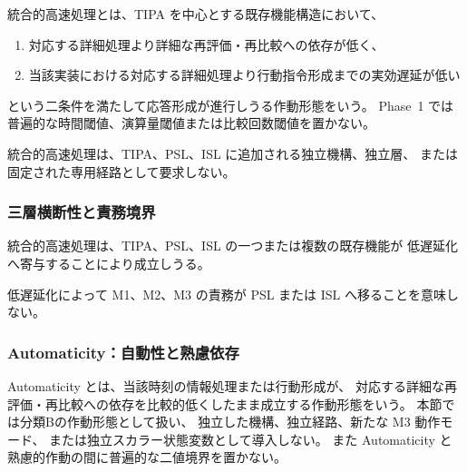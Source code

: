 \begin{definition}
\label{def:integrated_fast_processing}
統合的高速処理とは、TIPA を中心とする既存機能構造において、
\begin{enumerate}
  \item 対応する詳細処理より詳細な再評価・再比較への依存が低く、
  \item 当該実装における対応する詳細処理より行動指令形成までの実効遅延が低い
\end{enumerate}
という二条件を満たして応答形成が進行しうる作動形態をいう。
Phase~1 では普遍的な時間閾値、演算量閾値または比較回数閾値を置かない。
\end{definition}

\begin{remark}[高速処理は独立構成要素ではない]
\label{rem:fast_not_component}
統合的高速処理は、TIPA、PSL、ISL に追加される独立機構、独立層、
または固定された専用経路として要求しない。
\end{remark}

\subsubsection{三層横断性と責務境界}
\label{subsubsec:fast_cross_layer}

\begin{definition}
\label{def:fast_cross_layer}
統合的高速処理は、TIPA、PSL、ISL の一つまたは複数の既存機能が
低遅延化へ寄与することにより成立しうる。
\end{definition}

\begin{remark}[高速処理はTIPAの責務を代替しない]
\label{rem:fast_no_tipa_substitution}
低遅延化によって M1、M2、M3 の責務が PSL または ISL へ移ることを意味しない。
\end{remark}

\subsubsection{Automaticity：自動性と熟慮依存}
\label{subsubsec:automaticity}

\begin{remark}[Automaticityと熟慮依存度]
\label{rem:automaticity_deliberation}
Automaticity とは、当該時刻の情報処理または行動形成が、
対応する詳細な再評価・再比較への依存を比較的低くしたまま成立する作動形態をいう。
本節では分類Bの作動形態として扱い、
独立した機構、独立経路、新たな M3 動作モード、
または独立スカラー状態変数として導入しない。
また Automaticity と熟慮的作動の間に普遍的な二値境界を置かない。
\end{remark}

